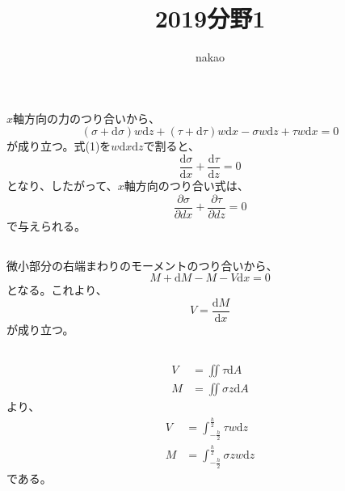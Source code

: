 \documentclass[a4paper]{jsarticle}
\begin{document}
\title{2019分野1}
\author{nakao}
\maketitle

\section{}
\subsection{}
$x$軸方向の力のつり合いから、
\begin{equation}
  (\sigma + \mathrm{d} \sigma) w \mathrm{d} z
  + (\tau + \mathrm{d} \tau) w \mathrm{d} x
  - \sigma w \mathrm{d} z
  + \tau w \mathrm{d} x = 0
\end{equation}
が成り立つ。式(1)を$w \mathrm{d} x \mathrm{d} z$で割ると、
\begin{equation}
  \frac{\mathrm{d} \sigma}{\mathrm{d} x}
  + \frac{\mathrm{d} \tau}{\mathrm{d} z} = 0
\end{equation}
となり、したがって、$x$軸方向のつり合い式は、
\begin{equation}
  \frac{\partial \sigma}{\partial{d} x}
  + \frac{\partial \tau}{\partial{d} z} = 0
\end{equation}
で与えられる。

\subsection{}
微小部分の右端まわりのモーメントのつり合いから、
\begin{equation}
  M + \mathrm{d} M - M - V \mathrm{d} x = 0
\end{equation}
となる。これより、
\begin{equation}
  V = \frac{\mathrm{d} M}{\mathrm{d} x}
\end{equation}
が成り立つ。

\subsection{}
\begin{align}
  V & = \iint \tau \mathrm{d} A     \\
  M & = \iint \sigma z \mathrm{d} A
\end{align}
より、
\begin{align}
  V & = \int_{-\frac{h}{2}}^{\frac{h}{2}} \tau w \mathrm{d} z     \\
  M & = \int_{-\frac{h}{2}}^{\frac{h}{2}} \sigma z w \mathrm{d} z
\end{align}
である。
\end{document}
